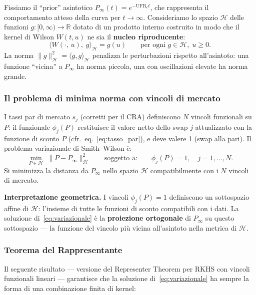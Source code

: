 \documentclass[11pt,a4paper]{article}
\theoremstyle{plain}
\theoremstyle{definition}
\theoremstyle{remark}
\newcommand{\R}{\mathbb{R}}
\newcommand{\UFR}{\ensuremath{\mathrm{UFR}}}
\begin{document}
Fissiamo il ``prior'' asintotico $P_\infty(t)=e^{-\UFR_c t}$, che rappresenta
il comportamento atteso della curva per $t\to\infty$.
Consideriamo lo spazio $\mathcal{H}$ delle funzioni $g:[0,\infty)\to\R$
dotato di un prodotto interno costruito in modo che il kernel di Wilson
$W(t,u)$ ne sia il \textbf{nucleo riproducente}:
\[
  \langle W(\cdot,\, u),\; g \rangle_{\mathcal{H}} = g(u)
  \qquad \text{per ogni } g \in \mathcal{H},\; u \ge 0.
\]
La norma $\|g\|_{\mathcal{H}}^2 = \langle g,g\rangle_{\mathcal{H}}$ penalizza
le perturbazioni rispetto all'asintoto: una funzione ``vicina'' a $P_\infty$
ha norma piccola, una con oscillazioni elevate ha norma grande.

\subsubsection*{Il problema di minima norma con vincoli di mercato}

I tassi par di mercato $s_j$ (corretti per il CRA) definiscono $N$ vincoli
funzionali su $P$: il funzionale $\phi_j(P)$ restituisce il valore netto
dello swap $j$ attualizzato con la funzione di sconto $P$
(cfr.~eq.~\eqref{eq:tasso_par}), e deve valere 1 (swap alla pari).
Il problema variazionale di Smith--Wilson \`e:
\begin{equation}
  \label{eq:variazionale}
  \min_{P \in \mathcal{H}}\;\|P - P_\infty\|_{\mathcal{H}}^2
  \qquad\text{soggetto a:}\qquad
  \phi_j(P) = 1, \quad j=1,\ldots,N.
\end{equation}
Si minimizza la distanza da $P_\infty$ nello spazio $\mathcal{H}$ compatibilmente
con i $N$ vincoli di mercato.

\textbf{Interpretazione geometrica.}
I vincoli $\phi_j(P)=1$ definiscono un sottospazio affine di $\mathcal{H}$:
l'insieme di tutte le funzioni di sconto compatibili con i dati.
La soluzione di~\eqref{eq:variazionale} \`e la \textbf{proiezione ortogonale}
di $P_\infty$ su questo sottospazio --- la funzione del vincolo pi\`u vicina
all'asintoto nella metrica di $\mathcal{H}$.

\subsubsection*{Teorema del Rappresentante}

Il seguente risultato --- versione del Representer Theorem per RKHS
con vincoli funzionali lineari --- garantisce che la soluzione di~\eqref{eq:variazionale}
ha sempre la forma di una combinazione finita di kernel:
\end{document}
